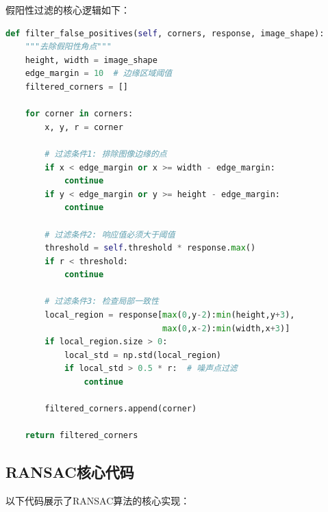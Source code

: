 \documentclass[a4paper]{article}
\begin{document}
假阳性过滤的核心逻辑如下：

\begin{lstlisting}[language=Python, caption=假阳性角点过滤]
def filter_false_positives(self, corners, response, image_shape):
    """去除假阳性角点"""
    height, width = image_shape
    edge_margin = 10  # 边缘区域阈值
    filtered_corners = []
    
    for corner in corners:
        x, y, r = corner
        
        # 过滤条件1: 排除图像边缘的点
        if x < edge_margin or x >= width - edge_margin:
            continue
        if y < edge_margin or y >= height - edge_margin:
            continue
        
        # 过滤条件2: 响应值必须大于阈值
        threshold = self.threshold * response.max()
        if r < threshold:
            continue
        
        # 过滤条件3: 检查局部一致性
        local_region = response[max(0,y-2):min(height,y+3),
                                max(0,x-2):min(width,x+3)]
        if local_region.size > 0:
            local_std = np.std(local_region)
            if local_std > 0.5 * r:  # 噪声点过滤
                continue
        
        filtered_corners.append(corner)
    
    return filtered_corners
\end{lstlisting}

\subsection{RANSAC核心代码}

以下代码展示了RANSAC算法的核心实现：
\end{document}
